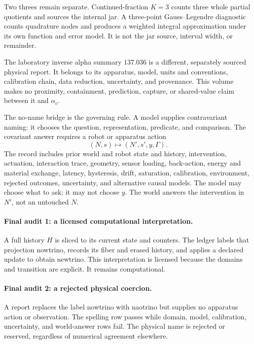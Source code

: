 Two threes remain separate.  Continued-fraction \(K=3\) counts three whole partial quotients and sources the internal
jar.  A three-point Gauss--Legendre diagnostic counts quadrature nodes and produces a weighted integral approximation
under its own function and error model.  It is not the jar source, interval width, or remainder.

The laboratory inverse alpha summary \(137.036\) is a different, separately sourced physical report.  It belongs to
its apparatus, model, units and conventions, calibration chain, data reduction, uncertainty, and provenance.  This
volume makes no proximity, containment, prediction, capture, or shared-value claim between it and \(\alpha_c\).

The no-name bridge is the governing rule.  A model supplies contravariant naming: it chooses the question,
representation, predicate, and comparison.  The covariant answer requires a robot or apparatus action
\[
                         (N,s)\longmapsto(N',s',y,\Gamma).
\]
The record includes prior world and robot state and history, intervention, actuation, interaction trace, geometry,
sensor loading, back-action, energy and material exchange, latency, hysteresis, drift, saturation, calibration,
environment, rejected outcomes, uncertainty, and alternative causal models.  The model may choose what to ask; it
may not choose \(y\).  The world answers the intervention in \(N'\), not an untouched \(N\).

\paragraph{Final audit 1: a licensed computational interpretation.}
A full history \(H\) is sliced to its current state and counters.  The ledger labels that projection nowtrino,
records its fiber and erased history, and applies a declared update to obtain newtrino.  This interpretation is
licensed because the domains and transition are explicit.  It remains computational.

\paragraph{Final audit 2: a rejected physical coercion.}
A report replaces the label nowtrino with naotrino but supplies no apparatus action or observation.  The spelling row
passes while domain, model, calibration, uncertainty, and world-answer rows fail.  The physical name is rejected or
reserved, regardless of numerical agreement elsewhere.

